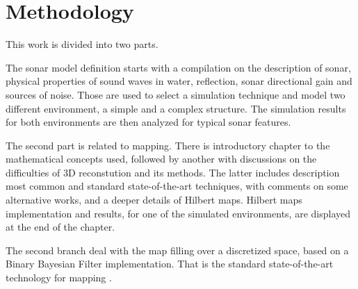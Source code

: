 

\section{Methodology}
 


% 


This work is divided into two parts.

The sonar model definition starts with a compilation on the description of
sonar, physical properties of sound waves in water, reflection, sonar
directional gain and sources of noise. Those are used to select a simulation
technique and model two different environment, a simple and a complex
structure. The simulation results for both environments are then analyzed for
typical sonar features.

The second part is related to mapping. There is introductory chapter to the
mathematical concepts used, followed by another with discussions on the
difficulties of 3D reconstution and its methods. The latter includes description
most common and standard state-of-the-art techniques, with comments on some
alternative works, and a deeper details of Hilbert maps. Hilbert maps
implementation and results, for one of the simulated environments, are
displayed at the end of the chapter.

The second branch deal with the map filling over a discretized space, based on
a Binary Bayesian Filter implementation. That is the standard state-of-the-art
technology for mapping \cite{thrunprob}.


